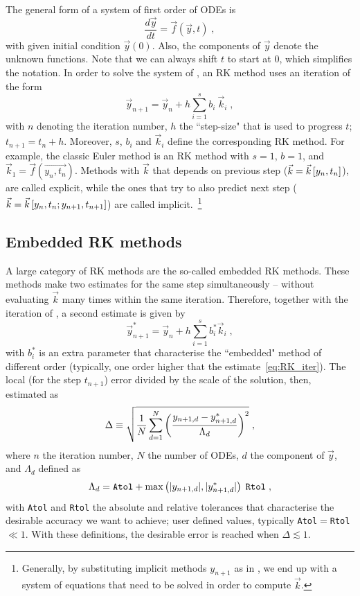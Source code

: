 \documentclass[11pt,a4paper]{article}
\begin{document}
The general form of a system of first order of ODEs is
%
\begin{equation}
	\dfrac{d\vec{y}}{dt}=\vec{f}(\vec{y},t) \;,
	\label{eq:ODE_definition}
\end{equation}
%
with given initial condition $\vec{y}(0)$. Also, the components of $\vec{y}$ denote the unknown functions. Note that we can always shift $t$ to start at $0$, which simplifies the notation. In order to solve the system of , an RK method uses an iteration of the form 
%
\begin{equation}
	\vec{y}_{n+1}=\vec{y}_{n}+ h\sum_{i=1}^{s} b_i \ \vec{k}_i \;,
	\label{eq:RK_iter}
\end{equation}
%
with $n$ denoting the iteration number, $h$ the ``step-size" that is used to progress $t$; $t_{n+1}=t_{n}+h$. Moreover, $s$, $b_i$ and $\vec{k}_i$ define the corresponding RK method. For example,
the classic Euler method is an RK method with $s=1$, $b=1$, and $\vec{k}_1 = \vec{f}(\vec{y_n , t_n})$. Methods with $\vec{k}$ that depends on previous step (\ie $\vec{k} =\vec{k}\left[ y_{n},t_{n} \right]$), are called explicit, while the ones that try to also predict next step (\ie $\vec{k} =\vec{k}\left[ y_{n},t_{n}; y_{n+1},t_{n+1} \right]$) are called implicit.~\footnote{Generally, by substituting  implicit methods $y_{n+1}$ as in , we end up with a system of equations that need to be solved in order to compute $\vec{k}$.} 

\subsection{Embedded RK methods}
%
A large category of RK methods are  the so-called embedded RK methods. These methods make two estimates for the same step simultaneously -- without evaluating  $\vec{k}$ many times within the same iteration. Therefore, together with the iteration of , a second estimate is given by
%
\begin{equation}
	\vec{y}_{n+1}^{*}=\vec{y}_{n}+ h\sum_{i=1}^{s} b_i^{*} \vec{k}_i \;,
	\label{eq:RK_Embedded_iter}
\end{equation}
%
with $b_i^{*}$ is an extra parameter that characterise the ``embedded" method of different order (typically, one order higher that the estimate~\ref{eq:RK_iter}). The local (for the step $t_{n+1}$) error divided by the scale of the solution, then, estimated as
%
\begin{equation}
	\Delta \equiv  \sqrt{\frac{1}{N}\sum_{d=1}^{N}\left( \frac{y_{n+1 ,d}-y^{*}_{n+1,d}}{ \Lambda_d } \right)^{2}} \;,
	\label{eq:error_estimate}
\end{equation}
%
where $n$ the iteration number, $N$ the number of ODEs, $d$ the component of $\vec{y}$, and $\Lambda_d$ defined as 
%
\begin{equation}
	\Lambda_d = {\tt Atol} + \max\left( |y_{n+1, d}|,|y^{*}_{n+1 ,d}| \right) \; {\tt Rtol} \;,
	\label{eq:RK_scale}
\end{equation}
%
with {\tt Atol} and {\tt Rtol} the absolute and relative tolerances that characterise the desirable accuracy we want to achieve; user defined values, typically {\tt Atol}$=${\tt Rtol}$\ll 1$.  With these definitions, the desirable error is reached when  $\Delta \lesssim 1$. 
\end{document}
